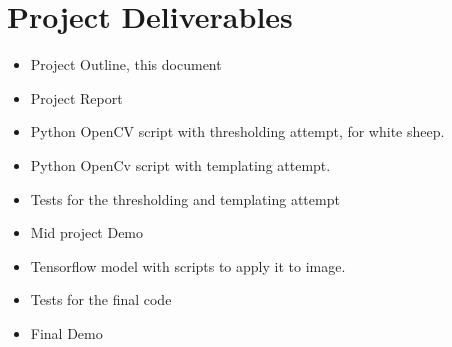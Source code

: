 \documentclass[11pt,fleqn,twoside]{article}
\begin{document}
\section{Project Deliverables}
\begin{itemize}
    \item Project Outline, this document
    \item Project Report
    \item Python OpenCV script with thresholding attempt, for white sheep.
    \item Python OpenCv script with templating attempt.
    \item Tests for the thresholding and templating attempt
    \item Mid project Demo
    \item Tensorflow model with scripts to apply it to image.
    \item Tests for the final code
    \item Final Demo
\end{itemize}


%
%
%

\end{document}

